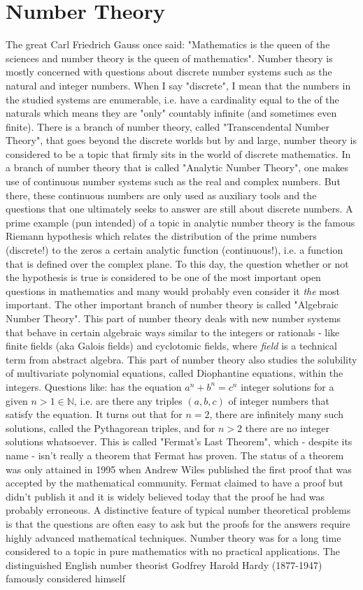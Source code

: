 \chapter{Number Theory}
The great Carl Friedrich Gauss once said: "Mathematics is the queen of the sciences and number theory is the queen of mathematics". Number theory is mostly concerned with questions about discrete number systems such as the natural and integer numbers. When I say "discrete", I mean that the numbers in the studied systems are enumerable, i.e. have a cardinality equal to the of the naturals which means they are "only" countably infinite (and sometimes even finite). There is a branch of number theory, called "Transcendental Number Theory", that goes beyond the discrete worlds but by and large, number theory is considered to be a topic that firmly sits in the world of discrete mathematics. In a branch of number theory that is called "Analytic Number Theory", one makes use of continuous number systems such as the real and complex numbers. But there, these continuous numbers are only used as auxiliary tools and the questions that one ultimately seeks to answer are still about discrete numbers. A prime example (pun intended) of a topic in analytic number theory is the famous Riemann hypothesis which relates the distribution of the prime numbers (discrete!) to the zeros a certain analytic function (continuous!), i.e. a function that is defined over the complex plane. To this day, the question whether or not the hypothesis is true is considered to be one of the most important open questions in mathematics and many would probably even consider it \emph{the} most important. The other important branch of number theory is called "Algebraic Number Theory". This part of number theory deals with new number systems that behave in certain algebraic ways similar to the integers or rationals - like finite fields (aka Galois fields) and cyclotomic fields, where \emph{field} is a technical term from abstract algebra. This part of number theory also studies the solubility of multivariate polynomial equations, called Diophantine equations, within the integers. Questions like: has the equation $a^n + b^n = c^n$ integer solutions for a given $n > 1 \in \mathbb{N}$, i.e. are there any triples $(a,b,c)$ of integer numbers that satisfy the equation. It turns out that for $n=2$, there are infinitely many such solutions, called the Pythagorean triples, and for $n > 2$ there are no integer solutions whatsoever. This is called "Fermat's Last Theorem", which - despite its name - isn't really a theorem that Fermat has proven. The status of a theorem was only attained in 1995 when Andrew Wiles published the first proof that was accepted by the mathematical community. Fermat claimed to have a proof but didn't publish it and it is widely believed today that the proof he had was probably erroneous. A distinctive feature of typical number theoretical problems is that the questions are often easy to ask but the proofs for the answers require highly advanced mathematical techniques. Number theory was for a long time considered to a topic in pure mathematics with no practical applications. The distinguished English number theorist Godfrey Harold Hardy (1877-1947) famously considered himself 